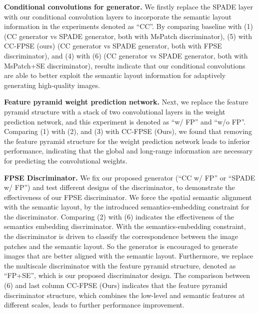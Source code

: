 \documentclass{article}
\begin{document}
\noindent\textbf{Conditional convolutions for generator.}
We firstly replace the SPADE layer with our conditional convolution layers to incorporate the semantic layout information in the experiments denoted as ``CC''.
By comparing baseline with (1) (CC generator vs SPADE generator, both with MsPatch discriminator), (5) with CC-FPSE (ours) (CC generator vs SPADE generator, both with FPSE discriminator), and (4) with (6) (CC generator vs SPADE generator, both with MsPatch+SE discriminator), results indicate that our conditional convolutions are able to better exploit the semantic layout information for adaptively generating high-quality images.

\noindent\textbf{Feature pyramid weight prediction network.}
Next, we replace the feature pyramid structure with a stack of two convolutional layers in the weight prediction network, and this experiment is denoted as ``w/ FP'' and ``w/o FP''.
Comparing (1) with (2), and (3) with CC-FPSE (Ours), we found that removing the feature pyramid structure for the weight prediction network leads to inferior performance, indicating that the global and long-range information are necessary for predicting the convolutional weights.

\noindent\textbf{FPSE Discriminator.}
We fix our proposed generator (``CC w/ FP'' or ``SPADE w/ FP'') and test different designs of the discriminator, to demonstrate the effectiveness of our FPSE discriminator.
We force the spatial semantic alignment with the semantic layout, by the introduced semantics-embedding constraint for the discriminator. Comparing (2) with (6) indicates the effectiveness of the semantics embedding discriminator.
With the semantics-embedding constraint, the discriminator is driven to classify the correspondence between the image patches and the semantic layout.
So the generator is encouraged to generate images that are better aligned with the semantic layout.
Furthermore, we replace the multiscale discriminator with the feature pyramid structure, denoted as ``FP+SE'', which is our proposed discriminator design. The comparison between (6) and last column CC-FPSE (Ours) indicates that the feature pyramid discriminator structure, which combines the low-level and semantic features at different scales, leads to further performance improvement.
\end{document}

